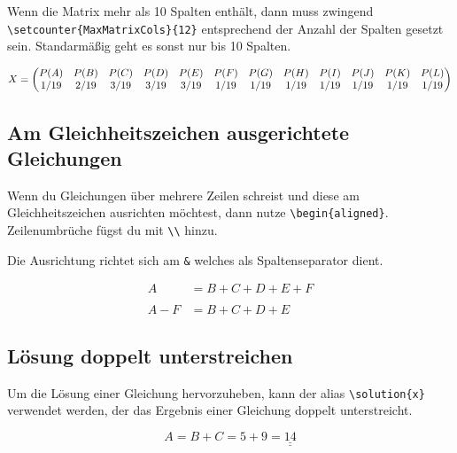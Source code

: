 \documentclass[
    12pt,
    a4paper,
            ngerman,
        bibliography=totocnumbered,
    listof=totocnumbered
]{scrartcl}
\newcommand{\solution}[1]{\underline{\underline{#1}}}
\begin{document}
Wenn die Matrix mehr als 10 Spalten enthält, dann muss zwingend
\texttt{\textbackslash{}setcounter\{MaxMatrixCols\}\{12\}} entsprechend
der Anzahl der Spalten gesetzt sein. Standarmäßig geht es sonst nur bis
10 Spalten.

\[
\setcounter{MaxMatrixCols}{12}X = 
 \begin{pmatrix}
P(A) & P(B) & P(C) & P(D) & P(E) & P(F) & P(G) & P(H) & P(I) & P(J) & P(K) & P(L)\\
1/19 & 2/19 & 3/19 & 3/19 & 3/19 & 1/19 & 1/19 & 1/19 & 1/19 & 1/19 & 1/19 & 1/19\\
\end{pmatrix}\]

\hypertarget{am-gleichheitszeichen-ausgerichtete-gleichungen}{%
\subsection{Am Gleichheitszeichen ausgerichtete
Gleichungen}\label{am-gleichheitszeichen-ausgerichtete-gleichungen}}

Wenn du Gleichungen über mehrere Zeilen schreist und diese am
Gleichheitszeichen ausrichten möchtest, dann nutze
\texttt{\textbackslash{}begin\{aligned\}}. Zeilenumbrüche fügst du mit
\texttt{\textbackslash{}\textbackslash{}} hinzu.

Die Ausrichtung richtet sich am \texttt{\&} welches als Spaltenseparator
dient.

\[ \displaystyle
\begin{aligned}
A &  = B + C + D + E + F\\
& \\
 A - F & = B + C + D + E 
\end{aligned}\]

\hypertarget{luxf6sung-doppelt-unterstreichen}{%
\subsection{Lösung doppelt
unterstreichen}\label{luxf6sung-doppelt-unterstreichen}}

Um die Lösung einer Gleichung hervorzuheben, kann der alias
\texttt{\textbackslash{}solution\{x\}} verwendet werden, der das
Ergebnis einer Gleichung doppelt unterstreicht.

\[
A = B + C = 5 + 9 = \solution{14}
\]






%
\end{document}
